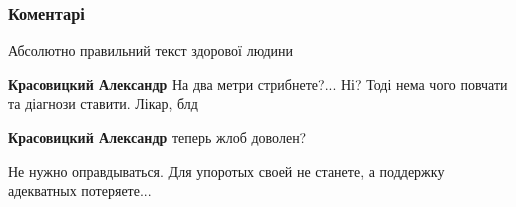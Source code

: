  
 
 
 
 
\subsubsection{Коментарі}

\begin{itemize}
 
Абсолютно правильний текст здорової людини

\begin{itemize}
 
\textbf{Красовицкий Александр} На два метри стрибнете?... Ні? Тоді нема чого повчати та діагнози ставити. Лікар, блд

 
\textbf{Красовицкий Александр} теперь жлоб доволен?
\end{itemize}

 

Не нужно оправдываться. Для упоротых своей не станете, а поддержку адекватных
потеряете...

\begin{itemize}
 

\end{itemize}
\end{itemize}
